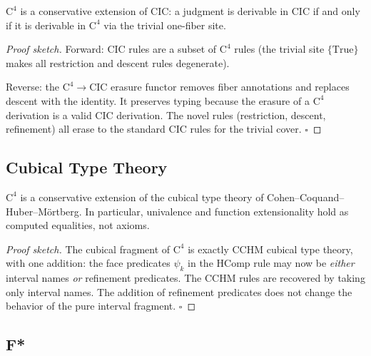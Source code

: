 \begin{theorem}
\label{thm:conservativity-cic}
$\mathrm{C}^4$ is a conservative extension of CIC: a judgment is
derivable in CIC if and only if it is derivable in $\mathrm{C}^4$
via the trivial one-fiber site.
\end{theorem}

\begin{proof}[Proof sketch]
Forward: CIC rules are a subset of $\mathrm{C}^4$ rules (the trivial
site \(\{\mathrm{True}\}\) makes all restriction and descent rules
degenerate).

Reverse: the $\mathrm{C}^4 \to \mathrm{CIC}$ erasure functor
removes fiber annotations and replaces descent with the identity.
It preserves typing because the erasure of a $\mathrm{C}^4$
derivation is a valid CIC derivation.  The novel rules (restriction,
descent, refinement) all erase to the standard CIC rules for the
trivial cover.  \hfill\(\square\)
\end{proof}

\subsection{Cubical Type Theory}

\begin{theorem}
$\mathrm{C}^4$ is a conservative extension of the cubical type theory
of Cohen--Coquand--Huber--M\"ortberg.  In particular, univalence and
function extensionality hold as computed equalities, not axioms.
\end{theorem}

\begin{proof}[Proof sketch]
The cubical fragment of $\mathrm{C}^4$ is exactly CCHM cubical type
theory, with one addition: the face predicates \(\psi_k\) in the HComp
rule may now be \emph{either} interval names \emph{or} refinement
predicates.  The CCHM rules are recovered by taking only interval
names.  The addition of refinement predicates does not change the
behavior of the pure interval fragment.  \hfill\(\square\)
\end{proof}

\subsection{F*}

